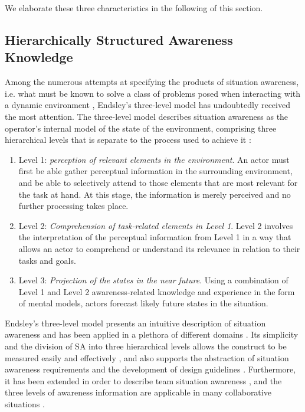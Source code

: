 We elaborate these three characteristics in the following of this section.

\subsection{Hierarchically Structured Awareness Knowledge} %
\label{sub:awareness_as_product}
Among the numerous attempts at specifying the products of situation awareness, i.e. what must be known to solve a class of problems posed when interacting with a dynamic environment \cite{Salmon2008}, Endsley's three-level model \cite{Endsley1995} has undoubtedly received the most attention. The three-level model describes situation awareness as the operator's internal model of the state of the environment, comprising three hierarchical levels that is separate to the process used to achieve it \cite{Smith1995}:

\begin{enumerate}
	\item Level 1: \emph{perception of relevant elements in the environment}. An actor must first be able gather perceptual information in the surrounding environment, and be able to selectively attend to those elements that are most relevant for the task at hand. At this stage, the information is merely perceived and no further processing takes place. 
	\item Level 2: \emph{Comprehension of task-related elements in Level 1}. Level 2 involves the interpretation of the perceptual information from Level 1 in a way that allows an actor to comprehend or understand its relevance in relation to their tasks and goals.
	\item Level 3: \emph{Projection of the states in the near future}. Using a combination of Level 1 and Level 2 awareness-related knowledge and experience in the form of mental models, actors forecast likely future states in the situation.
\end{enumerate}

Endsley's three-level model presents an intuitive description of situation awareness and has been applied in a plethora of different domains \cite{Wickens2008}. Its simplicity and the division of SA into three hierarchical levels allows the construct to be measured easily and effectively \cite{endsley1995measurement}, and also supports the abstraction of situation awareness requirements and the development of design guidelines \cite{Salmon2008}. Furthermore, it has been extended in order to describe team situation awareness \cite{endsley2001model}, and the three levels of awareness information are applicable in many collaborative situations \cite{Gutwin2002}.

